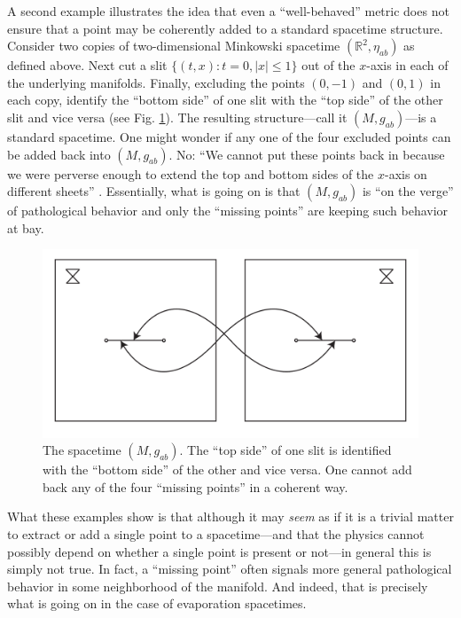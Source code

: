 \documentclass[authoryear,12pt,3p]{jowarticle}
\begin{document}
A second example illustrates the idea that even a ``well-behaved'' metric does not ensure that a point may be coherently added to a standard spacetime structure. Consider two copies of two-dimensional Minkowski spacetime $(\mathbb{R}^2, \eta_{ab})$ as defined above. Next cut a slit $\{(t,x): t=0, |x|\leq 1\}$ out of the $x$-axis in each of the underlying manifolds. Finally, excluding the points $(0,-1)$ and $(0,1)$ in each copy, identify the ``bottom side'' of one slit with the ``top side'' of the other slit and vice versa (see Fig. \ref{Slits}). The resulting structure---call it $(M,g_{ab})$---is a standard spacetime. One might wonder if any one of the four excluded points can be added back into $(M,g_{ab})$. No: ``We cannot put these points back in because we were perverse enough to extend the top and bottom sides of the $x$-axis on different sheets'' \citep[p. 59]{Hawking+Ellis}. Essentially, what is going on is that $(M,g_{ab})$ is ``on the verge'' of pathological behavior and only the ``missing points'' are keeping such behavior at bay.


\begin{figure}[h]    \centering
   \includegraphics[width=5in]{ManchakBH2.pdf}
   \caption{\label{Slits} The spacetime $(M,g_{ab})$. The ``top side'' of one slit is identified with the ``bottom side'' of the other and vice versa. One cannot add back any of the four ``missing points'' in a coherent way.}
\end{figure}

What these examples show is that although it may \emph{seem} as if it is a trivial matter to extract or add a single point to a spacetime---and that the physics cannot possibly depend on whether a single point is present or not---in general this is simply not true.  In fact, a ``missing point'' often signals more general pathological behavior in some neighborhood of the manifold.  And indeed, that is precisely what is going on in the case of evaporation spacetimes.
\end{document}
